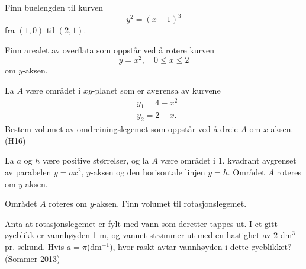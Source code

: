 \documentclass[a4paper,norsk,11pt]{interaktiv}
\begin{document}
\begin{oppgave}{9}
  Finn buelengden til kurven $$ y^2= (x-1)^3$$ fra $(1,0)$ til
  $(2,1)$.\\[-6pt]
\end{oppgave}

\begin{oppgave}{10}
  Finn arealet av overflata som oppstår ved å rotere kurven
  $$y=x^2, \quad 0\leq x \leq 2$$ om $y$-aksen.\\[-6pt]
\end{oppgave}

\begin{oppgave}{11}
  La $A$ være området i $xy$-planet som er avgrensa av kurvene
  \begin{align*}
    &y_1=4-x^2 \\
    &y_2=2-x.
  \end{align*}
  Bestem volumet av omdreiningslegemet som oppstår ved å dreie $A$ om
  $x$-aksen. \\[3mm] (H16) \\[-6pt]
\end{oppgave}

\begin{oppgave}{12}
  La $a$ og $h$ være positive størrelser, og la $A$ være området i
  $1$. kvadrant avgrenset av parabelen $y=ax^2$, $y$-aksen og den
  horisontale linjen $y=h$. Området $A$ roteres om $y$-aksen.

  \setcounter{Punkt}{0}

  \bPunkt
    Området $A$ roteres om $y$-aksen. Finn volumet til rotasjonslegemet.
  \ePunkt

  \bPunkt
    Anta at rotasjonslegemet er fylt med vann som deretter tappes ut. I
    et gitt øyeblikk er vannhøyden 1 m, og vannet strømmer ut med en
    hastighet av $2$ dm$^3$ pr. sekund. Hvis $a= \pi $(dm$^{-1}$), hvor
    raskt avtar vannhøyden i dette øyeblikket?
  \ePunkt
  (Sommer 2013)\\[-6pt]
\end{oppgave}
\end{document}
